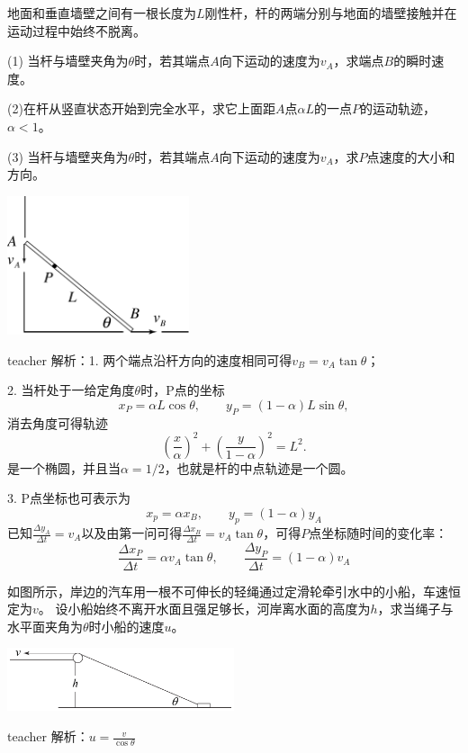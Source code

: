 \begin{example}
地面和垂直墙壁之间有一根长度为$L$刚性杆，杆的两端分别与地面的墙壁接触并在运动过程中始终不脱离。

(1) 当杆与墙壁夹角为$\theta$时，若其端点$A$向下运动的速度为$v_A$，求端点$B$的瞬时速度。

(2)在杆从竖直状态开始到完全水平，求它上面距$A$点$\alpha L$的一点$P$的运动轨迹，$\alpha<1$。

(3) 当杆与墙壁夹角为$\theta$时，若其端点$A$向下运动的速度为$v_A$，求$P$点速度的大小和方向。
\begin{flushright}
\includegraphics[width=0.4\textwidth]{images/motion-problem-42.pdf}
\end{flushright}

\begin{taggedblock}{teacher}
\noindent
解析：1. 两个端点沿杆方向的速度相同可得$v_B = v_A\tan\theta$；

2. 当杆处于一给定角度$\theta$时，P点的坐标
\[
x_P = \alpha L \cos\theta,\qquad y_P = (1-\alpha)L\sin\theta,
\]
消去角度可得轨迹
\[
\left(\frac{x}{\alpha}\right)^2+\left(\frac{y}{1-\alpha}\right)^2 = L^2.
\]
是一个椭圆，并且当$\alpha = 1/2$，也就是杆的中点轨迹是一个圆。

3. P点坐标也可表示为
\[x_p = \alpha x_B,\qquad y_p = (1-\alpha)y_A\]
已知$\frac{\Delta y_A}{\Delta t} = v_A$以及由第一问可得$\frac{\Delta x_B}{\Delta t} = v_A\tan\theta$，可得$P$点坐标随时间的变化率：
\[
\frac{\Delta x_P}{\Delta t} = \alpha v_A\tan\theta,\qquad \frac{\Delta y_P}{\Delta t} = (1-\alpha)v_A
\]
\end{taggedblock}
\end{example}


\begin{example}
如图所示，岸边的汽车用一根不可伸长的轻绳通过定滑轮牵引水中的小船，车速恒定为$v$。
设小船始终不离开水面且强足够长，河岸离水面的高度为$h$，求当绳子与水平面夹角为$\theta$时小船的速度$u$。
\begin{flushright}
\includegraphics[width = 0.5\textwidth]{images/motion-42.pdf} 
\end{flushright}
\begin{taggedblock}{teacher}
\noindent
解析：$u=\frac{v}{\cos\theta}$
\end{taggedblock}
\end{example}


